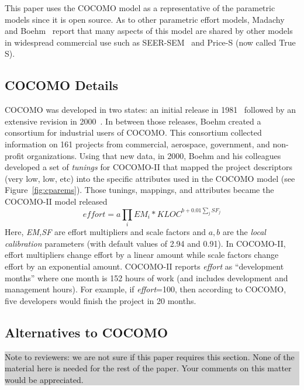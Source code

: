 \documentclass[final,twocolumn]{elsarticle}
\newcommand{\fig}[1]{Figure~\ref{fig:#1}}
\theoremstyle{break}
\begin{document}
 This paper uses the COCOMO model as a representative of the parametric models since it is open source.
 As to other parametric effort models,
 Madachy and Boehm~\cite{madachy2008comparative} report that many aspects of this model
 are shared by other models in widespread commercial
 use such as  SEER-SEM~\cite{boehm00b} and Price-S (now called True S).



  \subsection{COCOMO Details}

  COCOMO was developed in two states: an initial release in 1981~\cite{boehm81}
  followed by an extensive revision in  2000~\cite{boehm00b}.
  In between those releases,
  Boehm created a consortium for
industrial users of COCOMO.
This consortium
collected information on 161 projects from commercial,
aerospace, government, and non-profit organizations.
Using that new data, in 2000, Boehm and his colleagues developed
a set of   {\em tunings} for COCOMO-II that
mapped the project descriptors (very low, low, etc)
into the specific attributes used in the COCOMO model (see \fig{cparems}).
Those tunings, mappings, and attributes became the COCOMO-II model
released 
\begin{equation}\label{eq:cocII}
\mathit{effort}=a\prod_i EM_i *\mathit{KLOC}^{b+0.01\sum_j SF_j}
\end{equation}
Here, {\em EM,SF} are  effort multipliers and scale
factors and
 $a,b$ are the {\em local calibration} parameters (with default values of 2.94 and 0.91).
 In COCOMO-II, effort multipliers change effort by a linear amount
 while scale factors change effort by an exponential amount.
COCOMO-II reports {\em effort}
as ``development months'' where one month
is 152 hours of work  (and includes development and management hours).
For example, if {\em effort}=100, then according to COCOMO,
five developers would finish
the project in 20 months.





\subsection{Alternatives to COCOMO} \label{sect:altCoc}

\noindent\colorbox{lightgray}{%
    \parbox{\dimexpr\linewidth-2\fboxsep}%
        {Note to reviewers: we are not sure if this paper requires this section. None of the material here is needed for the rest of the paper. Your comments on this matter would be appreciated.
        }
}
 
\end{document}

